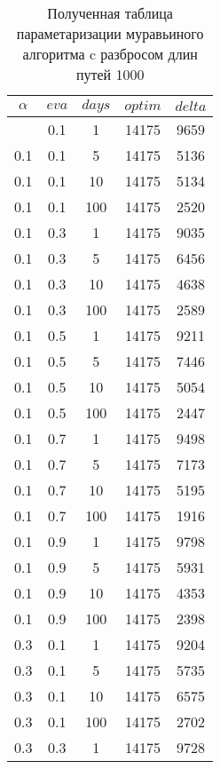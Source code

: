 \begin{appendices}
	\begin{longtable}{|c|c|c|c|c|}
		\caption{Полученная таблица параметаризации муравьиного алгоритма  c разбросом длин путей 1000}\label{t:params_1}\\
		\hline
		$\alpha$ & $eva$ & $days$ & $optim$ & $delta$ \\ \hline
		\endhead
		\endfoot
		0.1   & 0.1   & 1 &     14175 & 9659 \\ \hline
		0.1   & 0.1    & 5    & 14175 & 5136  \\ \hline
		0.1   & 0.1    & 10   & 14175 & 5134  \\ \hline
		0.1   & 0.1    & 100  & 14175 & 2520  \\ \hline
		0.1   & 0.3    & 1    & 14175 & 9035  \\ \hline
		0.1   & 0.3    & 5    & 14175 & 6456  \\ \hline
		0.1   & 0.3    & 10   & 14175 & 4638  \\ \hline
		0.1   & 0.3    & 100  & 14175 & 2589  \\ \hline
		0.1   & 0.5    & 1    & 14175 & 9211  \\ \hline
		0.1   & 0.5    & 5    & 14175 & 7446  \\ \hline
		0.1   & 0.5    & 10   & 14175 & 5054  \\ \hline
		0.1   & 0.5    & 100  & 14175 & 2447  \\ \hline
		0.1   & 0.7    & 1    & 14175 & 9498  \\ \hline
		0.1   & 0.7    & 5    & 14175 & 7173  \\ \hline
		0.1   & 0.7    & 10   & 14175 & 5195  \\ \hline
		0.1   & 0.7    & 100  & 14175 & 1916  \\ \hline
		0.1   & 0.9    & 1    & 14175 & 9798  \\ \hline
		0.1   & 0.9    & 5    & 14175 & 5931  \\ \hline
		0.1   & 0.9    & 10   & 14175 & 4353  \\ \hline
		0.1   & 0.9    & 100  & 14175 & 2398  \\ \hline
		0.3   & 0.1    & 1    & 14175 & 9204  \\ \hline
		0.3   & 0.1    & 5    & 14175 & 5735  \\ \hline
		0.3   & 0.1    & 10   & 14175 & 6575  \\ \hline
		0.3   & 0.1    & 100  & 14175 & 2702  \\ \hline
		0.3   & 0.3    & 1    & 14175 & 9728  \\ \hline

\end{longtable}
\end{appendices}
